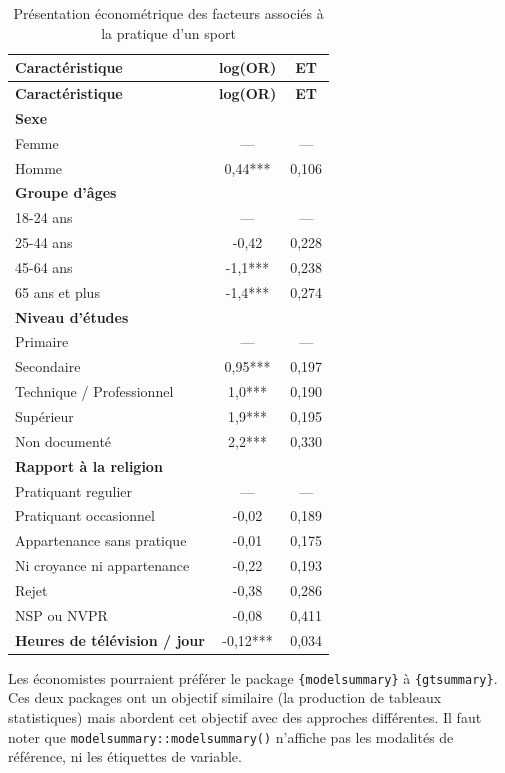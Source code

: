 \documentclass[
  letterpaper,
  DIV=11,
  numbers=noendperiod,
  oneside]{scrreprt}
\begin{document}
\hypertarget{tbl-regression-presentation_econometrique}{}
\begin{longtable}[]{@{}lcc@{}}
\caption{\label{tbl-regression-presentation_econometrique}Présentation
économétrique des facteurs associés à la pratique d'un
sport}\tabularnewline
\toprule()
\textbf{Caractéristique} & \textbf{log(OR)} & \textbf{ET} \\
\midrule()
\endfirsthead
\toprule()
\textbf{Caractéristique} & \textbf{log(OR)} & \textbf{ET} \\
\midrule()
\endhead
\textbf{Sexe} & & \\
Femme & --- & --- \\
Homme & 0,44*** & 0,106 \\
\textbf{Groupe d'âges} & & \\
18-24 ans & --- & --- \\
25-44 ans & -0,42 & 0,228 \\
45-64 ans & -1,1*** & 0,238 \\
65 ans et plus & -1,4*** & 0,274 \\
\textbf{Niveau d'études} & & \\
Primaire & --- & --- \\
Secondaire & 0,95*** & 0,197 \\
Technique / Professionnel & 1,0*** & 0,190 \\
Supérieur & 1,9*** & 0,195 \\
Non documenté & 2,2*** & 0,330 \\
\textbf{Rapport à la religion} & & \\
Pratiquant regulier & --- & --- \\
Pratiquant occasionnel & -0,02 & 0,189 \\
Appartenance sans pratique & -0,01 & 0,175 \\
Ni croyance ni appartenance & -0,22 & 0,193 \\
Rejet & -0,38 & 0,286 \\
NSP ou NVPR & -0,08 & 0,411 \\
\textbf{Heures de télévision / jour} & -0,12*** & 0,034 \\
\bottomrule()
\end{longtable}

Les économistes pourraient préférer le package \texttt{\{modelsummary\}}
à \texttt{\{gtsummary\}}. Ces deux packages ont un objectif similaire
(la production de tableaux statistiques) mais abordent cet objectif avec
des approches différentes. Il faut noter que
\texttt{modelsummary::modelsummary()} n'affiche pas les modalités de
référence, ni les étiquettes de variable.
\end{document}
